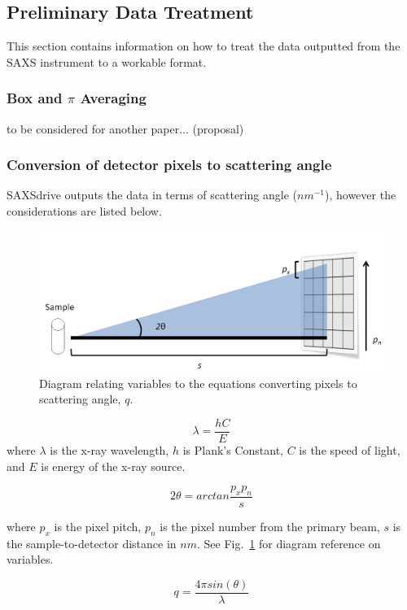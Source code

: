 \documentclass[10pt]{article}%
\begin{document}
\subsection{Preliminary Data Treatment}
This section contains information on how to treat the data outputted from the SAXS instrument to a workable format. 

\subsubsection{Box and $\pi$ Averaging}
to be considered for another paper... (proposal)

\subsubsection{Conversion of detector pixels to scattering angle}
SAXSdrive outputs the data in terms of scattering angle ($nm^{-1}$), however the considerations are listed below.  
\begin{figure}[ht]
\centering
\includegraphics[scale=.35]{images/pixel2q_diagram.png}
\caption{Diagram relating variables to the equations converting pixels to scattering angle, $q$.}
\label{pixel2q}
\end{figure}

\begin{equation}
\lambda= \frac{hC}{E}
\end{equation}
where $\lambda$ is the x-ray wavelength, $h$ is Plank's Constant, $C$ is the speed of light, and $E$ is energy of the x-ray source.

\begin{equation}
2\theta=arctan \frac{p_x p_n}{s}
\end{equation}

where $p_x$ is the pixel pitch, $p_n$ is the pixel number from the primary beam, $s$ is the sample-to-detector distance in $nm$. See Fig.~\ref{pixel2q} for diagram reference on variables.  

\begin{equation}
q=\frac{4 \pi sin(\theta)}{\lambda}
\end{equation}
\end{document}
